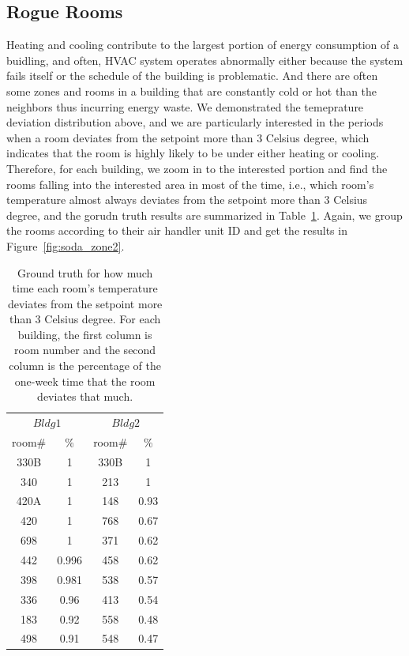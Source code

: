 \subsection{Rogue Rooms}
Heating and cooling contribute to the largest portion of energy consumption of a buidling, and often, HVAC system operates abnormally either because the system fails itself or the schedule of the building is problematic. And there are often some zones and rooms in a building that are constantly cold or hot than the neighbors thus incurring energy waste. We demonstrated the temeprature deviation distribution above, and we are particularly interested in the periods when a room deviates from the setpoint more than 3 Celsius degree, which indicates that the room is highly likely to be under either heating or cooling. Therefore, for each building, we zoom in to the interested portion and find the rooms falling into the interested area in most of the time, i.e., which room's temperature almost always deviates from the setpoint more than 3 Celsius degree, and the gorudn truth results are summarized in Table~\ref{tab:rogue}. Again, we group the rooms according to their air handler unit ID and get the results in Figure~\ref{fig:soda_zone2}.

\begin{table}[ht!]
 \begin{center}
	\begin{tabular}{|c|c|c|c|}
	\multicolumn{2}{c}{$Bldg 1$}
	 & \multicolumn{2}{c}{$Bldg 2$}\\
	\cline{1-4} 
	 room\# & \% & room\# & \%\\
	\cline{1-4}
	 330B & 1 & 330B & 1\\
	\cline{1-4}
	 340 & 1 & 213 & 1\\
	\cline{1-4}
	420A & 1 & 148 & 0.93\\
	\cline{1-4}
	420 & 1 & 768 & 0.67\\
	\cline{1-4}
	698 & 1 & 371 & 0.62\\
	\cline{1-4}
	442 & 0.996 & 458 & 0.62\\
	\cline{1-4}
	398 & 0.981 & 538 & 0.57\\
	\cline{1-4}
	336 & 0.96 & 413 & 0.54\\
	\cline{1-4}
	183 & 0.92 & 558 & 0.48\\
	\cline{1-4}
	498 & 0.91 & 548 & 0.47\\
	\cline{1-4}
	\end{tabular}
 \end{center}
 \caption{Ground truth for how much time each room's temperature deviates from the setpoint more than 3 Celsius degree. For each building, the first column is room number and the second column is the percentage of the one-week time that the room deviates that much.}
 \label{tab:rogue}
\end{table}

